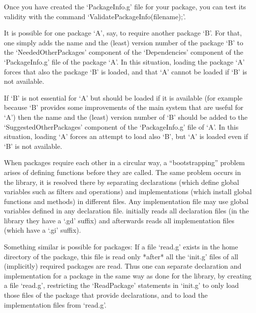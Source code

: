 Once   you   have   created   the  `PackageInfo.g'   file   for   your
package,   you    can   test    its   validity   with    the   command
`ValidatePackageInfo(filename);'.


It is possible for one {\GAP} package `A', say, to require another package
`B'.
For that, one simply adds the name and the (least) version number of the
package `B' to the `NeededOtherPackages' component of the `Dependencies'
component of the `PackageInfo.g' file of the package `A'.
In this situation, loading the package `A' forces that also the package
`B' is loaded, and that `A' cannot be loaded if `B' is not available.

If `B' is not essential for `A' but should be loaded if it is available
(for example because `B' provides some improvements of the main system
that are useful for `A')
then the name and the (least) version number of `B' should be added to the
`SuggestedOtherPackages' component of the `PackageInfo.g' file of `A'.
In this situation, loading `A' forces an attempt to load also `B',
but `A' is loaded even if `B' is not available.




When {\GAP} packages require each other in a circular way,
a ``bootstrapping'' problem arises of defining functions before they are
called.
The same problem occurs in the {\GAP} library, it is resolved there
by separating declarations (which define global variables such as
filters and operations)
and implementations (which install global functions and methods)
in different files.
Any implementation file may use global variables defined in any declaration
file.
{\GAP} initially reads all declaration files (in the library they have a
`.gd' suffix) and afterwards reads all implementation files
(which have a `.gi' suffix).

Something similar is possible for {\GAP} packages:
If a file `read.g' exists in the home directory of the package,
this file is read only *after* all the `init.g' files of all (implicitly)
required {\GAP} packages are read.
Thus one can separate declaration and implementation for a {\GAP} package
in the same way as done for the {\GAP} library,
by creating a file `read.g', restricting the `ReadPackage' statements in
`init.g' to only load those files of the package that provide declarations,
and to load the implementation files from `read.g'.

